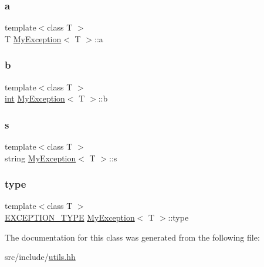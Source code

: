 \subsubsection{\texorpdfstring{a}{a}}
{\footnotesize\ttfamily template$<$class T $>$ \\
T \mbox{\hyperlink{class_my_exception}{My\+Exception}}$<$ T $>$\+::a}

\mbox{\label{class_my_exception_a42f4256beeac79f7ad8ad9682a9b83ee}} 
\subsubsection{\texorpdfstring{b}{b}}
{\footnotesize\ttfamily template$<$class T $>$ \\
\mbox{\hyperlink{draw_8hh_aa620a13339ac3a1177c86edc549fda9b}{int}} \mbox{\hyperlink{class_my_exception}{My\+Exception}}$<$ T $>$\+::b}

\mbox{\label{class_my_exception_ac8762871298754f14ce579ee2c928510}} 
\subsubsection{\texorpdfstring{s}{s}}
{\footnotesize\ttfamily template$<$class T $>$ \\
string \mbox{\hyperlink{class_my_exception}{My\+Exception}}$<$ T $>$\+::s}

\mbox{\label{class_my_exception_a6a422c140340e945df9548f548ea0ed8}} 
\subsubsection{\texorpdfstring{type}{type}}
{\footnotesize\ttfamily template$<$class T $>$ \\
\mbox{\hyperlink{utils_8hh_af26a5d951fd6ab4b44e6cd8425aa0383}{E\+X\+C\+E\+P\+T\+I\+O\+N\+\_\+\+T\+Y\+PE}} \mbox{\hyperlink{class_my_exception}{My\+Exception}}$<$ T $>$\+::type}



The documentation for this class was generated from the following file\+:\begin{DoxyCompactItemize}
\item 
src/include/\mbox{\hyperlink{utils_8hh}{utils.\+hh}}\end{DoxyCompactItemize}
